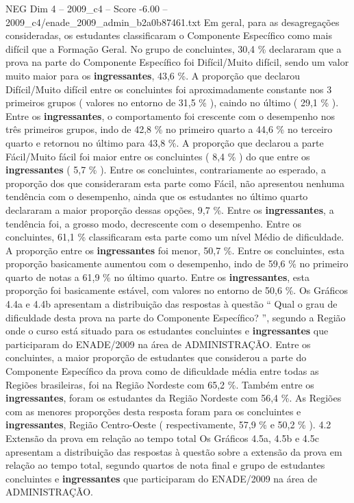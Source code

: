 \begin{textsample}{NEG Dim 4 – 2009\_c4 – Score -6.00 – 2009\_c4/enade\_2009\_admin\_b2a0b87461.txt}
Em geral, para as desagregações consideradas, os estudantes classificaram o Componente Específico como mais difícil que a Formação Geral.
No grupo de concluintes, 30,4 \% declararam que a prova na parte do Componente Específico foi Difícil/Muito difícil, sendo um valor muito maior para os \textbf{ingressantes}, 43,6 \%.
A proporção que declarou Difícil/Muito difícil entre os concluintes foi aproximadamente constante nos 3 primeiros grupos ( valores no entorno de 31,5 \% ), caindo no último ( 29,1 \% ).
Entre os \textbf{ingressantes}, o comportamento foi crescente com o desempenho nos três primeiros grupos, indo de 42,8 \% no primeiro quarto a 44,6 \% no terceiro quarto e retornou no último para 43,8 \%.
A proporção que declarou a parte Fácil/Muito fácil foi maior entre os concluintes ( 8,4 \% ) do que entre os \textbf{ingressantes} ( 5,7 \% ).
Entre os concluintes, contrariamente ao esperado, a proporção dos que consideraram esta parte como Fácil, não apresentou nenhuma tendência com o desempenho, ainda que os estudantes no último quarto declararam a maior proporção dessas opções, 9,7 \%.
Entre os \textbf{ingressantes}, a tendência foi, a grosso modo, decrescente com o desempenho.
Entre os concluintes, 61,1 \% classificaram esta parte como um nível Médio de dificuldade.
A proporção entre os \textbf{ingressantes} foi menor, 50,7 \%.
Entre os concluintes, esta proporção basicamente aumentou com o desempenho, indo de 59,6 \% no primeiro quarto de notas a 61,9 \% no último quarto.
Entre os \textbf{ingressantes}, esta proporção foi basicamente estável, com valores no entorno de 50,6 \%.
Os Gráficos 4.4a e 4.4b apresentam a distribuição das respostas à questão “ Qual o grau de dificuldade desta prova na parte do Componente Específico? ”, segundo a Região onde o curso está situado para os estudantes concluintes e \textbf{ingressantes} que participaram do ENADE/2009 na área de ADMINISTRAÇÃO.
Entre os concluintes, a maior proporção de estudantes que considerou a parte do Componente Específico da prova como de dificuldade média entre todas as Regiões brasileiras, foi na Região Nordeste com 65,2 \%.
Também entre os \textbf{ingressantes}, foram os estudantes da Região Nordeste com 56,4 \%.
As Regiões com as menores proporções desta resposta foram para os concluintes e \textbf{ingressantes}, Região Centro-Oeste ( respectivamente, 57,9 \% e 50,2 \% ). 4.2 Extensão da prova em relação ao tempo total Os Gráficos 4.5a, 4.5b e 4.5c apresentam a distribuição das respostas à questão sobre a extensão da prova em relação ao tempo total, segundo quartos de nota final e grupo de estudantes concluintes e \textbf{ingressantes} que participaram do ENADE/2009 na área de ADMINISTRAÇÃO.

\end{textsample}
